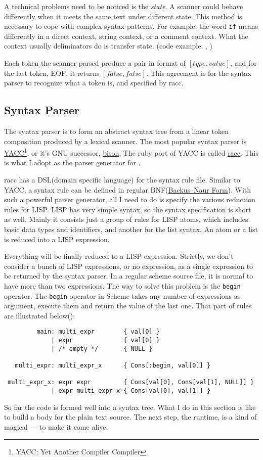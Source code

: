 A technical problems need to be noticed is the \emph{state}. A scanner could
behave differently when it meets the same text under different
state. This method is necessary to cope with complex syntax patterns.
For example, the word \verb+if+ means differently in a direct context,
string context, or a comment context. What the context usually
deliminators do is transfer state. (code example:
,
)

Each token the scanner parsed produce a pair in format of $[type,
value]$, and for the last token, EOF, it returns $[false,
false]$. This agreement is for the syntax parser to recognize what a
token is, and specified by racc.

\subsection{Syntax Parser}
The syntax parser is to form an abstract syntax tree from a linear token
composition produced by a lexical scanner. The most popular syntax
parser is
\href{http://dinosaur.compilertools.net/yacc/}{YACC}\footnote{YACC: Yet
  Another Compiler Compiler}, or it's GNU successor,
\href{https://www.gnu.org/software/bison/}{bison}. The ruby port of
YACC is called \href{https://github.com/tenderlove/racc}{racc}. This
is what I adopt as the parser generator for \revo.

racc has a DSL(domain specific language) for the syntax rule
file. Similar to YACC, a syntax rule can be defined in regular
BNF(\href{https://en.wikipedia.org/wiki/Backus-Naur_form}{Backus–Naur
  Form}). With such a powerful parser generator, all I need to do is
specify the various reduction rules for LISP. LISP has very simple
syntax, so the syntax specification is short as well. Mainly it
consists just a group of rules for LISP atoms, which includes basic
data types and identifiers, and another for the
list syntax. An atom or a list is reduced into a LISP expression.

Everything will be finally reduced to a LISP expression. Strictly, we
don't consider a bunch of LISP expressions, or no expression, as a single
expression to be returned by the syntax parser. In a regular scheme
source file, it is normal to have more than two expressions. The way
to solve this problem is the \verb+begin+ operator. The \verb+begin+
operator in Scheme takes any number of expressions as argument,
execute them and return the value of the last one. That part of rules
are illustrated below():
\begin{verbatim}
         main: multi_expr        { val[0] }
             | expr              { val[0] }
             | /* empty */       { NULL }

   multi_expr: multi_expr_x      { Cons[:begin, val[0]] }

 multi_expr_x: expr expr         { Cons[val[0], Cons[val[1], NULL]] }
             | expr multi_expr_x { Cons[val[0], val[1]] }
\end{verbatim}

So far the code is formed well into a syntax tree. What I do in this
section is like to build a body for the plain text source. The next
step, the runtime, is a kind of magical --- to make it come alive.
